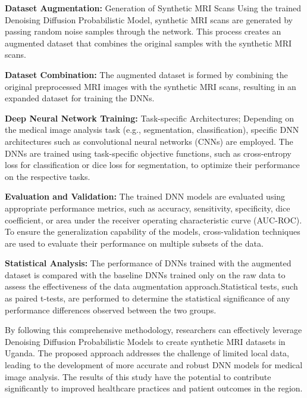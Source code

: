 \textbf{Dataset Augmentation:}
   Generation of Synthetic MRI Scans Using the trained Denoising Diffusion Probabilistic Model, synthetic MRI scans are generated by passing random noise samples through the network. This process creates an augmented dataset that combines the original samples with the synthetic MRI scans.

\textbf{Dataset Combination:} The augmented dataset is formed by combining the original preprocessed MRI images with the synthetic MRI scans, resulting in an expanded dataset for training the DNNs.

\textbf{Deep Neural Network Training:}
   Task-specific Architectures; Depending on the medical image analysis task (e.g., segmentation, classification), specific DNN architectures such as convolutional neural networks (CNNs) are employed.
   The DNNs are trained using task-specific objective functions, such as cross-entropy loss for classification or dice loss for segmentation, to optimize their performance on the respective tasks.

\textbf{Evaluation and Validation:}
   The trained DNN models are evaluated using appropriate performance metrics, such as accuracy, sensitivity, specificity, dice coefficient, or area under the receiver operating characteristic curve (AUC-ROC).
   To ensure the generalization capability of the models, cross-validation techniques are used to evaluate their performance on multiple subsets of the data.

\textbf{Statistical Analysis:}
   The performance of DNNs trained with the augmented dataset is compared with the baseline DNNs trained only on the raw data to assess the effectiveness of the data augmentation approach.Statistical tests, such as paired t-tests, are performed to determine the statistical significance of any performance differences observed between the two groups.

By following this comprehensive methodology, researchers can effectively leverage Denoising Diffusion Probabilistic Models to create synthetic MRI datasets in Uganda. The proposed approach addresses the challenge of limited local data, leading to the development of more accurate and robust DNN models for medical image analysis. The results of this study have the potential to contribute significantly to improved healthcare practices and patient outcomes in the region.
